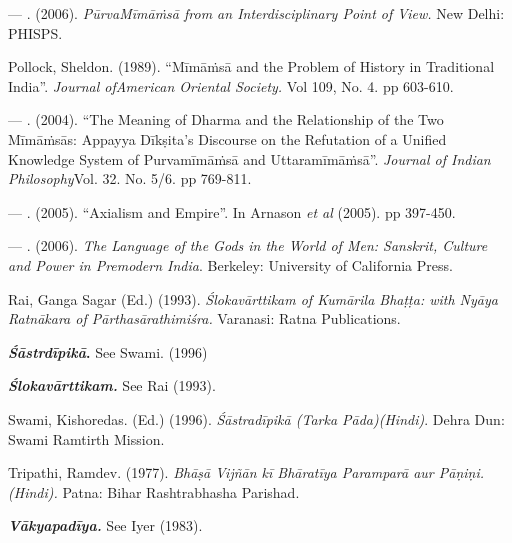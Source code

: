 \begin{thebibliography}{99}
  — . (2006). \textit{PūrvaMīmāṁsā from an Interdisciplinary Point of View.} New Delhi: PHISPS. 

  Pollock, Sheldon. (1989). “Mīmāṁsā and the Problem of History in Traditional India”. \textit{Journal ofAmerican Oriental Society.} Vol 109, No. 4. pp 603-610.

  — . (2004). “The Meaning of Dharma and the Relationship of the Two Mīmāṁsās: Appayya Dīkṣita’s Discourse on the Refutation of a Unified Knowledge System of Purvamīmāṁsā and Uttaramīmāṁsā”. \textit{Journal of Indian Philosophy}Vol. 32. No. 5/6. pp 769-811. 

  — . (2005). “Axialism and Empire”. In Arnason \textit{et al} (2005). pp 397-450.

  — . (2006). \textit{The Language of the Gods in the World of Men: Sanskrit, Culture and Power in Premodern India}. Berkeley: University of California Press.

  Rai, Ganga Sagar (Ed.) (1993). \textit{Ślokavārttikam of Kumārila Bhaṭṭa: with Nyāya Ratnākara of Pārthasārathimiśra.} Varanasi: Ratna Publications.

  \textbf{\textit{Śāstrdīpikā}.} See Swami. (1996)

  \textbf{\textit{Ślokavārttikam.}} See Rai (1993).

  Swami, Kishoredas. (Ed.) (1996). \textit{Śāstradīpikā (Tarka Pāda)(Hindi)}. Dehra Dun: Swami Ramtirth Mission.

  Tripathi, Ramdev. (1977). \textit{Bhāṣā Vijñān kī Bhāratīya Paramparā aur Pāṇiṇi. (Hindi).} Patna: Bihar Rashtrabhasha Parishad.

  \textbf{\textit{Vākyapadīya.}} See Iyer (1983).
 
 \end{thebibliography}
